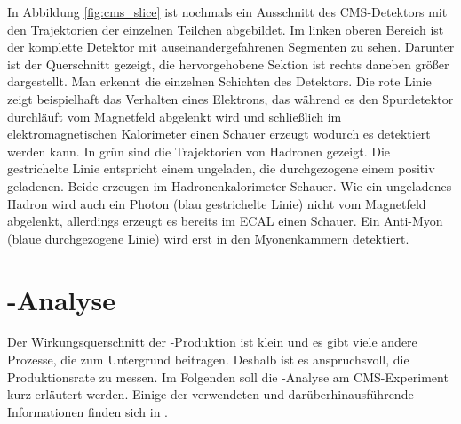 In Abbildung \ref{fig:cms_slice} ist nochmals ein Ausschnitt des CMS-Detektors mit den Trajektorien der einzelnen Teilchen abgebildet. Im linken oberen Bereich ist der komplette Detektor mit auseinandergefahrenen Segmenten zu sehen. Darunter ist der Querschnitt gezeigt, die hervorgehobene Sektion ist rechts daneben gr\"o\ss er dargestellt. Man erkennt die einzelnen Schichten des Detektors. Die rote Linie zeigt beispielhaft das Verhalten eines Elektrons, das w\"ahrend es den Spurdetektor durchl\"auft vom Magnetfeld abgelenkt wird und schlie\ss lich im elektromagnetischen Kalorimeter einen Schauer erzeugt wodurch es detektiert werden kann. In gr\"un sind die Trajektorien von Hadronen gezeigt. Die gestrichelte Linie entspricht einem ungeladen, die durchgezogene einem positiv geladenen. Beide erzeugen im Hadronenkalorimeter Schauer. Wie ein ungeladenes Hadron wird auch ein Photon (blau gestrichelte Linie) nicht vom Magnetfeld abgelenkt, allerdings erzeugt es bereits im ECAL einen Schauer. Ein Anti-Myon (blaue durchgezogene Linie) wird erst in den Myonenkammern detektiert. %

\section{\ttH-Analyse}
\label{ch:Experiment:sec:ttH}

Der Wirkungsquerschnitt der \ttH-Produktion ist klein und es gibt viele andere Prozesse, die zum Untergrund beitragen. Deshalb ist es anspruchsvoll, die Produktionsrate zu messen. Im Folgenden soll die \ttH-Analyse am CMS-Experiment kurz erl\"autert werden. Einige der verwendeten und dar\"uberhinausf\"uhrende Informationen finden sich in \cite{Khachatryan:2014qaa}.

